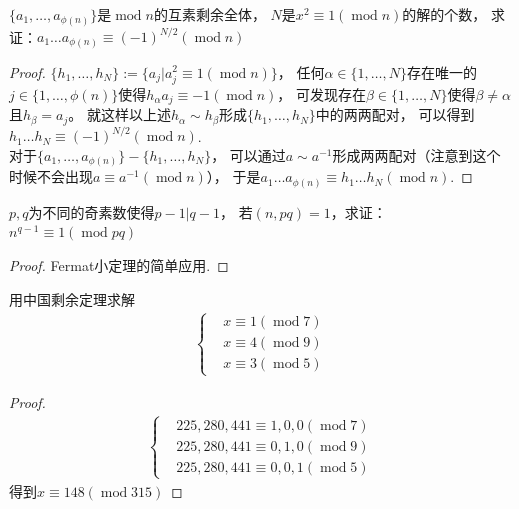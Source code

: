 \begin{exercise}
    $\{a_1,\ldots,a_{\phi(n)}\}$是$\operatorname{mod}n$的互素剩余全体，
    $N$是$x^2\equiv1(\operatorname{mod}n)$的解的个数，
    求证：$a_1\ldots a_{\phi(n)}\equiv(-1)^{N/2}(\operatorname{mod}n)$
\end{exercise}
\begin{proof}
    $\{h_1,\ldots,h_N\}:=\{a_j|a_j^2\equiv1(\operatorname{mod}n)\}$，
    任何$\alpha\in\{1,\dots,N\}$存在唯一的$j\in\{1,\dots,\phi(n)\}$使得$h_\alpha a_j\equiv-1(\operatorname{mod}n)$，
    可发现存在$\beta\in \{1,\dots,N\}$使得$\beta\neq\alpha$且$h_\beta=a_j$。
    就这样以上述$h_\alpha \sim h_\beta$形成$\{h_1,\ldots,h_N\}$中的两两配对，
    可以得到$h_1\ldots h_N\equiv(-1)^{N/2}(\operatorname{mod}n)$.\\
    \qquad 对于$\{a_1,\ldots,a_{\phi(n)}\}-\{h_1,\ldots,h_N\}$，
    可以通过$a \sim a^{-1}$形成两两配对（注意到这个时候不会出现$a\equiv a^{-1}(\operatorname{mod}n)$），
    于是$a_1\ldots a_{\phi(n)}\equiv h_1\ldots h_N(\operatorname{mod}n)$.
\end{proof}

\begin{exercise}
    $p,q$为不同的奇素数使得$p-1|q-1$，
    若$(n,pq)=1$，求证：$n^{q-1}\equiv1(\operatorname{mod}pq)$
\end{exercise}
\begin{proof}
    Fermat小定理的简单应用.
\end{proof}

\begin{exercise}
    用中国剩余定理求解\begin{align*}
        \left\{ 
        \begin{aligned}
            &x\equiv1(\operatorname{mod}7)\\
            &x\equiv4(\operatorname{mod}9)\\
            &x\equiv3(\operatorname{mod}5)
        \end{aligned}
         \right.
    \end{align*}
\end{exercise}
\begin{proof}
    \begin{align*}
        \left\{ 
        \begin{aligned}
            &225,280,441\equiv1,0,0(\operatorname{mod}7)\\
            &225,280,441\equiv0,1,0(\operatorname{mod}9)\\
            &225,280,441\equiv0,0,1(\operatorname{mod}5)
        \end{aligned}
         \right.
    \end{align*}
    得到$x\equiv148(\operatorname{mod}315)$
\end{proof}


